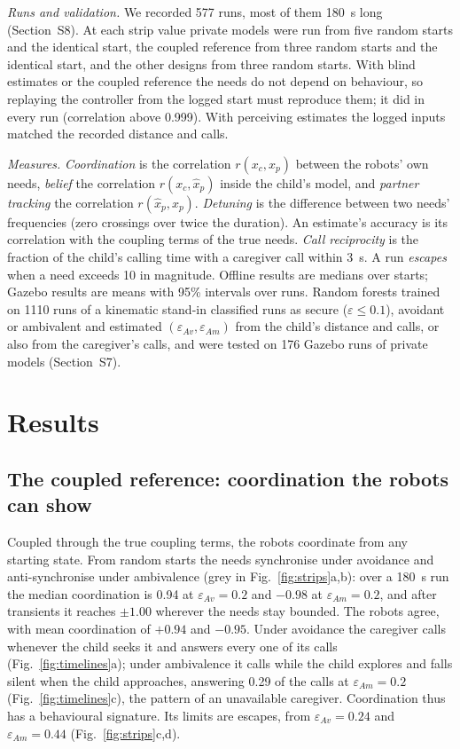 \documentclass[journal]{IEEEtran}
\newif\ifdraftmarkers
\newcommand{\citeneeded}[1]{\ifdraftmarkers\textcolor{red}{[CITE:~#1]}\addtocontents{cnd}{\protect\item #1}\fi}
\newcommand{\eav}{\varepsilon_{Av}}
\newcommand{\eam}{\varepsilon_{Am}}
\begin{document}
\emph{Runs and validation.} We recorded 577 runs, most of them 180~s long (Section~S8). At each strip value private models were run from five random starts and the identical start, the coupled reference from three random starts and the identical start, and the other designs from three random starts. With blind estimates or the coupled reference the needs do not depend on behaviour, so replaying the controller from the logged start must reproduce them; it did in every run (correlation above 0.999). With perceiving estimates the logged inputs matched the recorded distance and calls.

\emph{Measures.} \emph{Coordination} is the correlation $r(x_c,x_p)$ between the robots' own needs, \emph{belief} the correlation $r(x_c,\hat{x}_p)$ inside the child's model, and \emph{partner tracking} the correlation $r(\hat{x}_p,x_p)$. \emph{Detuning} is the difference between two needs' frequencies (zero crossings over twice the duration). An estimate's accuracy is its correlation with the coupling terms of the true needs. \emph{Call reciprocity} is the fraction of the child's calling time with a caregiver call within 3~s. A run \emph{escapes} when a need exceeds 10 in magnitude. Offline results are medians over starts; Gazebo results are means with 95\% intervals over runs. Random forests \citeneeded{random forests} trained on 1110 runs of a kinematic stand-in classified runs as secure ($\varepsilon\leq0.1$), avoidant or ambivalent and estimated $(\eav,\eam)$ from the child's distance and calls, or also from the caregiver's calls, and were tested on 176 Gazebo runs of private models (Section~S7).

\section{Results}
\label{sec:results}

\subsection{The coupled reference: coordination the robots can show}
\label{sec:r1}
Coupled through the true coupling terms, the robots coordinate from any starting state. From random starts the needs synchronise under avoidance and anti-synchronise under ambivalence (grey in Fig.~\ref{fig:strips}a,b): over a 180~s run the median coordination is 0.94 at $\eav=0.2$ and $-0.98$ at $\eam=0.2$, and after transients it reaches $\pm1.00$ wherever the needs stay bounded. The robots agree, with mean coordination of $+0.94$ and $-0.95$. Under avoidance the caregiver calls whenever the child seeks it and answers every one of its calls (Fig.~\ref{fig:timelines}a); under ambivalence it calls while the child explores and falls silent when the child approaches, answering 0.29 of the calls at $\eam=0.2$ (Fig.~\ref{fig:timelines}c), the pattern of an unavailable caregiver. Coordination thus has a behavioural signature. Its limits are escapes, from $\eav=0.24$ and $\eam=0.44$ (Fig.~\ref{fig:strips}c,d).
\end{document}
